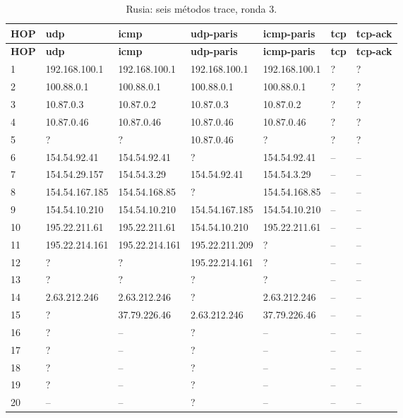 \begin{landscape}
\begingroup
\fontsize{9}{11}\selectfont
\begin{longtable}{p{0.95cm}p{3.725cm}p{3.725cm}p{3.725cm}p{3.725cm}p{3.725cm}p{3.725cm}}
\caption{Rusia: seis métodos trace, ronda 3.}\label{anexo:trace:37.79.226.46:3} \\
\toprule
\textbf{HOP} & \textbf{udp} & \textbf{icmp} & \textbf{udp-paris} & \textbf{icmp-paris} & \textbf{tcp} & \textbf{tcp-ack} \\ \midrule
\endfirsthead
\toprule
\textbf{HOP} & \textbf{udp} & \textbf{icmp} & \textbf{udp-paris} & \textbf{icmp-paris} & \textbf{tcp} & \textbf{tcp-ack} \\ \midrule
\endhead
1 & 192.168.100.1 & 192.168.100.1 & 192.168.100.1 & 192.168.100.1 & ? & ? \\
2 & 100.88.0.1 & 100.88.0.1 & 100.88.0.1 & 100.88.0.1 & ? & ? \\
3 & 10.87.0.3 & 10.87.0.2 & 10.87.0.3 & 10.87.0.2 & ? & ? \\
4 & 10.87.0.46 & 10.87.0.46 & 10.87.0.46 & 10.87.0.46 & ? & ? \\
5 & ? & ? & 10.87.0.46 & ? & ? & ? \\
6 & 154.54.92.41 & 154.54.92.41 & ? & 154.54.92.41 & -- & -- \\
7 & 154.54.29.157 & 154.54.3.29 & 154.54.92.41 & 154.54.3.29 & -- & -- \\
8 & 154.54.167.185 & 154.54.168.85 & ? & 154.54.168.85 & -- & -- \\
9 & 154.54.10.210 & 154.54.10.210 & 154.54.167.185 & 154.54.10.210 & -- & -- \\
10 & 195.22.211.61 & 195.22.211.61 & 154.54.10.210 & 195.22.211.61 & -- & -- \\
11 & 195.22.214.161 & 195.22.214.161 & 195.22.211.209 & ? & -- & -- \\
12 & ? & ? & 195.22.214.161 & ? & -- & -- \\
13 & ? & ? & ? & ? & -- & -- \\
14 & 2.63.212.246 & 2.63.212.246 & ? & 2.63.212.246 & -- & -- \\
15 & ? & 37.79.226.46 & 2.63.212.246 & 37.79.226.46 & -- & -- \\
16 & ? & -- & ? & -- & -- & -- \\
17 & ? & -- & ? & -- & -- & -- \\
18 & ? & -- & ? & -- & -- & -- \\
19 & ? & -- & ? & -- & -- & -- \\
20 & -- & -- & ? & -- & -- & -- \\
\bottomrule
\end{longtable}
\endgroup
\end{landscape}
